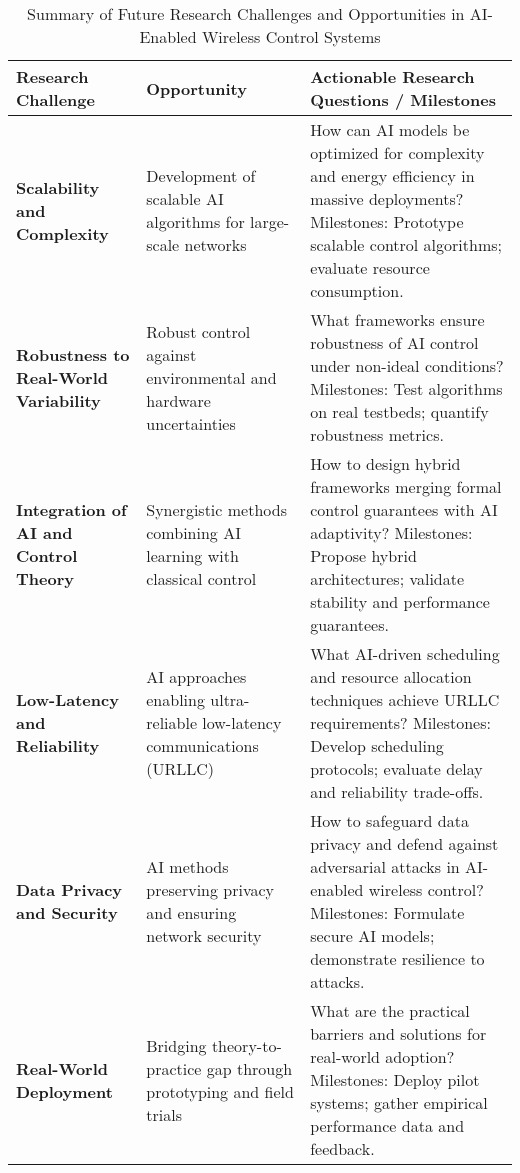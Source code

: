 \documentclass[sigconf]{acmart}
\begin{document}
\begin{table*}[htbp]
\centering
\caption{Summary of Future Research Challenges and Opportunities in AI-Enabled Wireless Control Systems}
\label{tab:future_directions}
\begin{adjustbox}{max width=\textwidth}
\begin{tabular}{@{}lll@{}}
\toprule
\textbf{Research Challenge} & \textbf{Opportunity} & \textbf{Actionable Research Questions / Milestones} \\ \midrule
\textbf{Scalability and Complexity} & Development of scalable AI algorithms for large-scale networks & How can AI models be optimized for complexity and energy efficiency in massive deployments? Milestones: Prototype scalable control algorithms; evaluate resource consumption. \\
\textbf{Robustness to Real-World Variability} & Robust control against environmental and hardware uncertainties & What frameworks ensure robustness of AI control under non-ideal conditions? Milestones: Test algorithms on real testbeds; quantify robustness metrics. \\
\textbf{Integration of AI and Control Theory} & Synergistic methods combining AI learning with classical control & How to design hybrid frameworks merging formal control guarantees with AI adaptivity? Milestones: Propose hybrid architectures; validate stability and performance guarantees. \\
\textbf{Low-Latency and Reliability} & AI approaches enabling ultra-reliable low-latency communications (URLLC) & What AI-driven scheduling and resource allocation techniques achieve URLLC requirements? Milestones: Develop scheduling protocols; evaluate delay and reliability trade-offs. \\
\textbf{Data Privacy and Security} & AI methods preserving privacy and ensuring network security & How to safeguard data privacy and defend against adversarial attacks in AI-enabled wireless control? Milestones: Formulate secure AI models; demonstrate resilience to attacks. \\
\textbf{Real-World Deployment} & Bridging theory-to-practice gap through prototyping and field trials & What are the practical barriers and solutions for real-world adoption? Milestones: Deploy pilot systems; gather empirical performance data and feedback. \\ \bottomrule
\end{tabular}
\end{adjustbox}
\end{table*}
\end{document}
